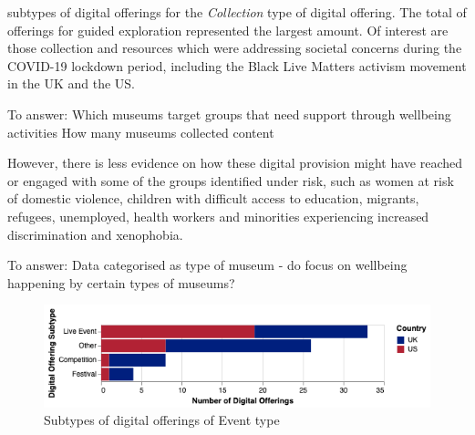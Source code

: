 \documentclass{egpubl}
\begin{document}
 subtypes of digital offerings for the \emph{Collection} type of digital offering. The total of offerings for guided exploration represented the largest amount. Of interest are those collection and resources which were addressing  societal concerns during the COVID-19 lockdown period, including the Black Live Matters activism movement in the UK and the US. 





\color{red}To answer:
Which museums target groups that need support through wellbeing activities
How many museums collected content 
\color{black}

However, there is less evidence on how these digital provision might have reached or engaged with some of the groups identified under risk, such as women at risk of domestic violence, children with difficult access to education, migrants, refugees, unemployed, health workers and minorities experiencing increased discrimination and xenophobia. 

\color{red}To answer: Data  categorised  as  type of museum - do focus on wellbeing happening by certain types of museums?\color{black}

\begin{figure}[h]
  \centering
  \includegraphics[width=\linewidth]{images/event.png}
  \caption{\label{fig:DigOffType3} 
           Subtypes of digital offerings of Event type}
\end{figure}
\end{document}
